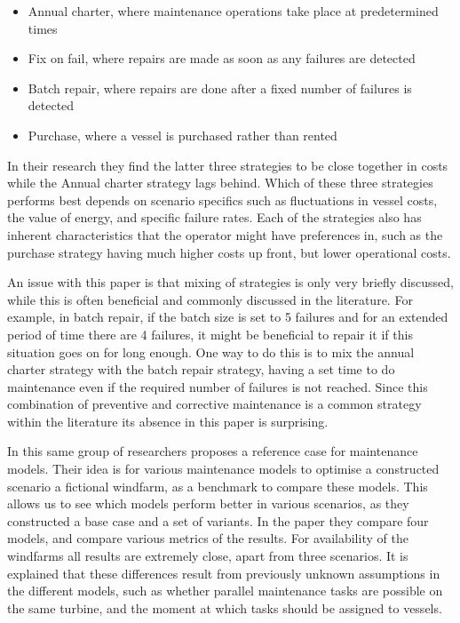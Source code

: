 \documentclass[a4paper,12pt]{article}
\begin{document}
\begin{itemize}
\item Annual charter, where maintenance operations take place at predetermined times
\item Fix on fail, where repairs are made as soon as any failures are detected
\item Batch repair, where repairs are done after a fixed number of failures is detected
\item Purchase, where a vessel is purchased rather than rented
\end{itemize}

In their research they find the latter three strategies to be close together in costs while the Annual charter strategy lags behind. Which of these three strategies performs best depends on scenario specifics such as fluctuations in vessel costs, the value of energy, and specific failure rates. Each of the strategies also has inherent characteristics that the operator might have preferences in, such as the purchase strategy having much higher costs up front, but lower operational costs. 

An issue with this paper is that mixing of strategies is only very briefly discussed, while this is often beneficial and commonly discussed in the literature. For example, in batch repair, if the batch size is set to 5 failures and for an extended period of time there are 4 failures, it might be beneficial to repair it if this situation goes on for long enough. One way to do this is to mix the annual charter strategy with the batch repair strategy, having a set time to do maintenance even if the required number of failures is not reached. Since this combination of preventive and corrective maintenance is a common strategy within the literature its absence in this paper is surprising.

\bigskip

In \cite{dinwoodie2015reference} this same group of researchers proposes a reference case for maintenance models. Their idea is for various maintenance models to optimise a constructed scenario a fictional windfarm, as a benchmark to compare these models. This allows us to see which models perform better in various scenarios, as they constructed a base case and a set of variants. In the paper they compare four models, and compare various metrics of the results. For availability of the windfarms all results are extremely close, apart from three scenarios. It is explained that these differences result from previously unknown assumptions in the different models, such as whether  parallel maintenance tasks are possible on the same turbine, and the moment at which tasks should be assigned to vessels. 
\end{document}
